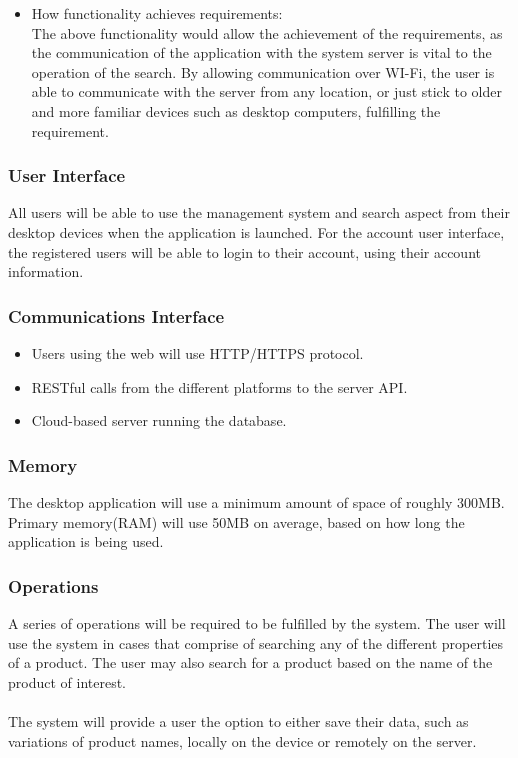 \documentclass[a4paper,10pt]{article}
\begin{document}
{\begin{enumerate}
\begin{itemize}
					\item How functionality achieves requirements:\\
The above functionality would allow the achievement of the requirements, as the communication of the application with the system server is vital to the operation of the search. By allowing communication over WI-Fi, the user is able to communicate with the server from any location, or just stick to older and more familiar devices such as desktop computers, fulfilling the requirement.
					\end{itemize}
			\end{enumerate} 
}

		
            \subsubsection{User Interface}
	    All users will be able to use the management system and search aspect from their desktop devices when the application is launched.
For the account user interface, the registered users will be able to login to their account, using their account information.
\\
	    \subsubsection{Communications Interface}
	 \begin{itemize}
	    \item Users using the web will use HTTP/HTTPS protocol.
	    \item RESTful calls from the different platforms to the server API.
	    \item Cloud-based server running the database.
	    \end{itemize}
	    
            \subsubsection{Memory}
	    {The desktop application will use a minimum amount of space of roughly 300MB.\\
		Primary memory(RAM) will use 50MB on average, based on how long the application is being used.}
		
            \subsubsection{Operations}

            	{A series of operations will be required to be fulfilled by the system. The user will use the system in cases that comprise of searching any of the different properties of a product. The user may also search for a product based on the name of the product of interest.\\\\
            	The system will provide a user the option to either save their data, such as variations of product names, locally on the device or remotely on the server.}
		
\end{document}
